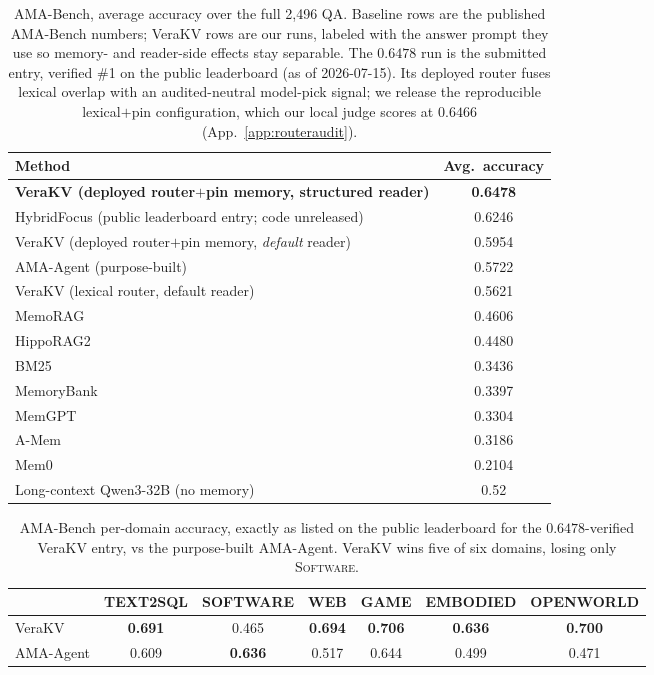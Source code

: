 \documentclass{article} %
\newcommand{\kvm}{VeraKV}
\begin{document}
\begin{table}[t]
\centering
\caption{AMA-Bench, average accuracy over the full 2{,}496 QA. Baseline rows are the
published AMA-Bench numbers; \kvm{} rows are our runs, labeled with the answer prompt
they use so memory- and reader-side effects stay separable. The $0.6478$ run is the
submitted entry, verified \#1 on the public leaderboard (as of 2026-07-15). Its deployed router fuses
lexical overlap with an audited-neutral model-pick signal; we release the reproducible lexical$+$pin
configuration, which our local judge scores at $0.6466$ (App.~\ref{app:routeraudit}).}
\label{tab:ama}
\small
\begin{tabular}{lc}
\toprule
Method & Avg.\ accuracy \\
\midrule
\textbf{\kvm{} (deployed router$+$pin memory, structured reader)} & \textbf{0.6478} \\
HybridFocus (public leaderboard entry; code unreleased) & 0.6246 \\
\kvm{} (deployed router$+$pin memory, \emph{default} reader) & 0.5954 \\
AMA-Agent (purpose-built) & 0.5722 \\
\kvm{} (lexical router, default reader) & 0.5621 \\
\midrule
MemoRAG~\citep{memorag} & 0.4606 \\
HippoRAG2~\citep{hipporag} & 0.4480 \\
BM25 & 0.3436 \\
MemoryBank~\citep{memorybank} & 0.3397 \\
MemGPT~\citep{memgpt} & 0.3304 \\
A-Mem~\citep{amem} & 0.3186 \\
Mem0~\citep{mem0} & 0.2104 \\
\midrule
Long-context Qwen3-32B (no memory) & 0.52 \\
\bottomrule
\end{tabular}
\end{table}

\begin{table}[t]
\centering
\caption{AMA-Bench per-domain accuracy, exactly as listed on the public
leaderboard for the $0.6478$-verified \kvm{} entry, vs the purpose-built
AMA-Agent. \kvm{} wins five of six domains, losing only \textsc{Software}.}
\label{tab:ama-domain}
\small
\setlength{\tabcolsep}{4pt}
\begin{tabular}{lcccccc}
\toprule
& TEXT2SQL & SOFTWARE & WEB & GAME & EMBODIED & OPENWORLD \\
\midrule
\kvm{}       & \textbf{0.691} & 0.465 & \textbf{0.694} & \textbf{0.706} & \textbf{0.636} & \textbf{0.700} \\
AMA-Agent    & 0.609 & \textbf{0.636} & 0.517 & 0.644 & 0.499 & 0.471 \\
\bottomrule
\end{tabular}
\end{table}
\end{document}
